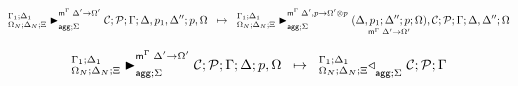 
\[
\trans{
   \matstatea{\Delta_N}{\lstack{C};
      \lstack{P}}{\Gamma}{\Delta, p_1, \Delta''}{p, \Omega}{\Delta' \rightarrow
         \Omega'}{\Sigma}
}
{
   \matstatea{\Delta_N}{\lframe{\Delta,
   p_1}{\Delta''}{p}{\Omega}{\Delta'}{\Omega'}, \lstack{C}; \lstack{P}}{\Gamma}{\Delta,
      \Delta''}{\Omega}{\Delta', p \rightarrow \Omega' \otimes p}{\Sigma}
}
\]

\[
\trans{
   \matstatea{\Delta_N}{\lstack{C}; \lstack{P}}{\Gamma}{\Delta}{p,
      \Omega}{\Delta' \rightarrow \Omega'}{\Sigma}
}
{
   \contstatea{\Delta_N}{\lstack{C} ; \lstack{P}}{\Gamma}{\Sigma}
}
\]
